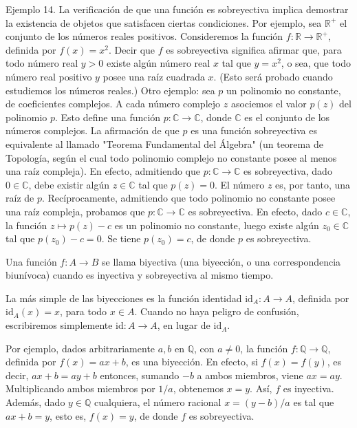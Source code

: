 \documentclass[12pt,oneside]{book}
\begin{document}
Ejemplo 14. La verificación de que una función es sobreyectiva implica demostrar la existencia de objetos que satisfacen ciertas condiciones. Por ejemplo, sea \( \mathbb{R}^+ \) el conjunto de los números reales positivos. Consideremos la función \( f: \mathbb{R} \to \mathbb{R}^+ \), definida por \( f(x) = x^2 \). Decir que \( f \) es sobreyectiva significa afirmar que, para todo número real \( y > 0 \) existe algún número real \( x \) tal que \( y = x^2 \), o sea, que todo número real positivo \( y \) posee una raíz cuadrada \( x \). (Esto será probado cuando estudiemos los números reales.) Otro ejemplo: sea \( p \) un polinomio no constante, de coeficientes complejos. A cada número complejo \( z \) asociemos el valor \( p(z) \) del polinomio \( p \). Esto define una función \( p: \mathbb{C} \to \mathbb{C} \), donde \( \mathbb{C} \) es el conjunto de los números complejos. La afirmación de que \( p \) es una función sobreyectiva es equivalente al llamado "Teorema Fundamental del Álgebra" (un teorema de Topología, según el cual todo polinomio complejo no constante posee al menos una raíz compleja). En efecto, admitiendo que \( p: \mathbb{C} \to \mathbb{C} \) es sobreyectiva, dado \( 0 \in \mathbb{C} \), debe existir algún \( z \in \mathbb{C} \) tal que \( p(z) = 0 \). El número \( z \) es, por tanto, una raíz de \( p \). Recíprocamente, admitiendo que todo polinomio no constante posee una raíz compleja, probamos que \( p: \mathbb{C} \to \mathbb{C} \) es sobreyectiva. En efecto, dado \( c \in \mathbb{C} \), la función \( z \mapsto p(z) - c \) es un polinomio no constante, luego existe algún \( z_0 \in \mathbb{C} \) tal que \( p(z_0) - c = 0 \). Se tiene \( p(z_0) = c \), de donde \( p \) es sobreyectiva.

Una función \( f: A \to B \) se llama biyectiva (una biyección, o una correspondencia biunívoca) cuando es inyectiva y sobreyectiva al mismo tiempo.

La más simple de las biyecciones es la función identidad \(\text{id}_A: A \to A\), definida por \(\text{id}_A(x) = x\), para todo \(x \in A\). Cuando no haya peligro de confusión, escribiremos simplemente \(\text{id}: A \to A\), en lugar de \(\text{id}_A\).

Por ejemplo, dados arbitrariamente \(a, b\) en \(\mathbb{Q}\), con \(a \neq 0\), la función \(f: \mathbb{Q} \to \mathbb{Q}\), definida por \(f(x) = ax + b\), es una biyección. En efecto, si \(f(x) = f(y)\), es decir, \(ax + b = ay + b\) entonces, sumando \(-b\) a ambos miembros, viene \(ax = ay\). Multiplicando ambos miembros por \(1/a\), obtenemos \(x = y\). Así, \(f\) es inyectiva. Además, dado \(y \in \mathbb{Q}\) cualquiera, el número racional \(x = (y - b)/a\) es tal que \(ax + b = y\), esto es, \(f(x) = y\), de donde \(f\) es sobreyectiva.
\end{document}
